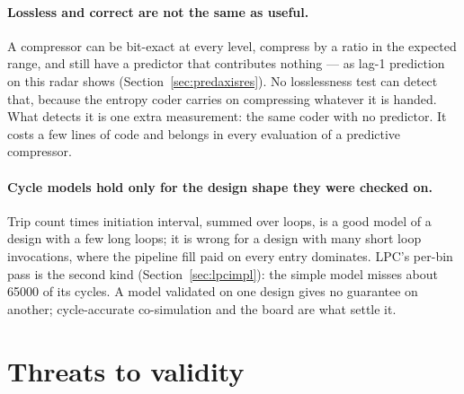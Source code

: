 \paragraph{Lossless and correct are not the same as useful.}
A compressor can be bit-exact at every level, compress by a ratio in the
expected range, and still have a predictor that contributes nothing --- as
lag-1 prediction on this radar shows (Section~\ref{sec:predaxisres}). No
losslessness test can detect that, because the entropy coder carries on
compressing whatever it is handed. What detects it is one extra measurement:
the same coder with no predictor. It costs a few lines of code and belongs in
every evaluation of a predictive compressor.

\paragraph{Cycle models hold only for the design shape they were checked on.}
Trip count times initiation interval, summed over loops, is a good model of a
design with a few long loops; it is wrong for a design with many short loop
invocations, where the pipeline fill paid on every entry dominates. LPC's
per-bin pass is the second kind (Section~\ref{sec:lpcimpl}): the simple model
misses about \num{65000} of its cycles. A model validated on one design gives no
guarantee on another; cycle-accurate co-simulation and the board are what
settle it.

\section{Threats to validity}
\label{sec:threats}


